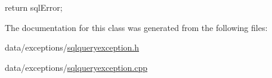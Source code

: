 \begin{DoxyCode}
{
    return sqlError;
}
\end{DoxyCode}


\-The documentation for this class was generated from the following files\-:\begin{DoxyCompactItemize}
\item 
data/exceptions/\hyperlink{sqlqueryexception_8h}{sqlqueryexception.\-h}\item 
data/exceptions/\hyperlink{sqlqueryexception_8cpp}{sqlqueryexception.\-cpp}\end{DoxyCompactItemize}
